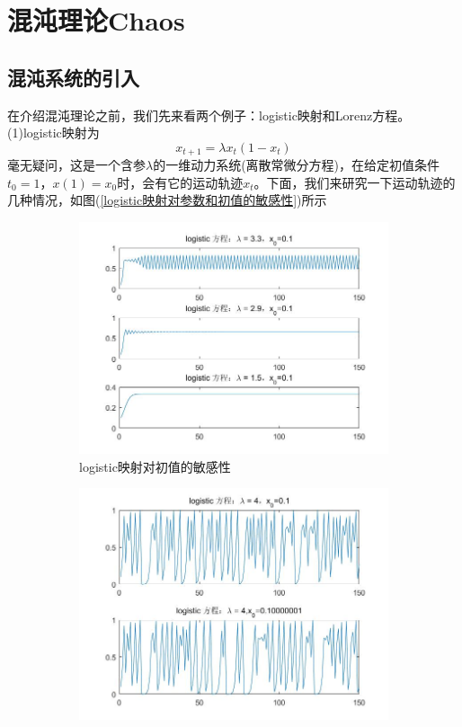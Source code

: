 \section{混沌理论Chaos}
    \subsection{混沌系统的引入}
        \par
        在介绍混沌理论之前，我们先来看两个例子：logistic映射和Lorenz方程。(1)logistic映射为
        \[
            x_{t+1}=\lambda x_t (1-x_t)
        \]
        毫无疑问，这是一个含参$\lambda$的一维动力系统(离散常微分方程)，在给定初值条件$t_0=1$，$x(1)=x_0$时，会有它的运动轨迹$x_t$。下面，我们来研究一下运动轨迹的几种情况，如图(\ref{logistic映射对参数和初值的敏感性})所示
	    \begin{figure}[H]
	        \centering
	        \begin{subfigure}[b]{0.4\textwidth}
	            \includegraphics[width=\textwidth]{images/logistic-lambda.jpg}
	            \caption{logistic映射对初值的敏感性}
	            \label{logistic映射对初值的敏感性}
	        \end{subfigure}
	        \begin{subfigure}[b]{0.4\textwidth}
	            \includegraphics[width=\textwidth]{images/logistic-x0.jpg}

\end{subfigure}
\end{figure}
